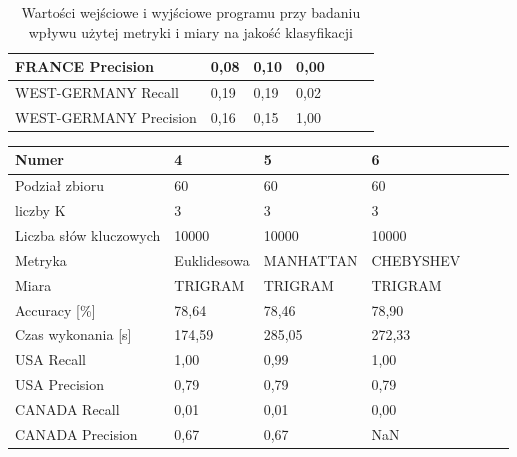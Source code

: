 \documentclass{classrep}
\begin{document}
{{\begin{table}[!htbp]
\begin{tabular}{|l|l|l|l|l|l|l|}
                    FRANCE Precision        & 0,08		        & 0,10		  & 0,00		 \\ \hline
                    WEST-GERMANY Recall     & 0,19		        & 0,19		  & 0,02		 \\ \hline
                    WEST-GERMANY Precision  & 0,16		        & 0,15		  & 1,00		 \\ \hline
                \end{tabular}
                \caption{Wartości wejściowe i wyjściowe programu przy badaniu wpływu użytej metryki i miary na jakość klasyfikacji}
            \end{table}
                \FloatBarrier

            \begin{table}[!htbp]
                \centering
                    \begin{tabular}{|l|l|l|l|l|l|l|}
                    \hline
                        Numer                  & 4                  & 5          & 6                \\ \hline
                        Podział zbioru         & 60		            & 60		 & 60		        \\ \hline
                        liczby K               & 3			        & 3			 & 3			 	\\ \hline
                        Liczba słów kluczowych & 10000		        & 10000		 & 10000		 	\\ \hline
                        Metryka                & Euklidesowa	    & MANHATTAN	 & CHEBYSHEV	 	\\ \hline
                        Miara                  & TRIGRAM	        & TRIGRAM	 & TRIGRAM	        \\ \hline
                        Accuracy {[}\%{]}      & 78,64		        & 78,46		 & 78,90		     \\ \hline
                        Czas wykonania {[}s{]} & 174,59	            & 285,05	 & 272,33	        \\ \hline
                        USA Recall             & 1,00		        & 0,99		 & 1,00		        \\ \hline
                        USA Precision          & 0,79		        & 0,79		 & 0,79		        \\ \hline
                        CANADA Recall          & 0,01		        & 0,01		 & 0,00		        \\ \hline
                        CANADA Precision       & 0,67		        & 0,67		 & NaN			     \\ \hline

\end{tabular}
\end{table}}}
\end{document}
